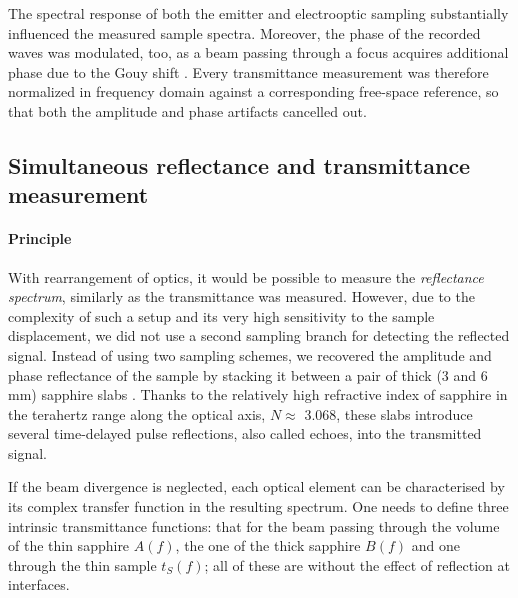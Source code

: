 
The spectral response of both the emitter and electrooptic sampling substantially influenced the measured sample spectra. Moreover, the phase of the recorded waves was modulated, too, as a beam passing through a focus acquires additional phase due to the Gouy shift \cite{kuzel2010gouy}. Every transmittance measurement was therefore normalized in frequency domain against a corresponding free-space reference, so that both the amplitude and phase artifacts cancelled out. 


\subsection{Simultaneous reflectance and transmittance measurement}
\paragraph{Principle} %
\label{srtm}
With rearrangement of optics, it would be possible to measure the \textit{reflectance spectrum}, similarly as the transmittance was measured. However, due to the complexity of such a setup and its very high sensitivity to the sample displacement, we did not use a second sampling branch for detecting the reflected signal. Instead of using two sampling schemes, we recovered the amplitude and phase reflectance of the sample by stacking it between a pair of thick (3 and 6 mm) sapphire slabs \cite{nemec2012resonant}. Thanks to the relatively high refractive index of sapphire in the terahertz range along the optical axis, $N \approx$ 3.068, these slabs introduce several time-delayed pulse reflections, also called echoes, into the transmitted signal.

If the beam divergence is neglected, each optical element can be characterised by its complex transfer function in the resulting spectrum. One needs to define three intrinsic transmittance functions: that for the beam passing through the volume of the thin sapphire $A(f)$, the one of the thick sapphire $B(f)$ and one through the thin sample $t_S(f)$; all of these are without the effect of reflection at interfaces. 

